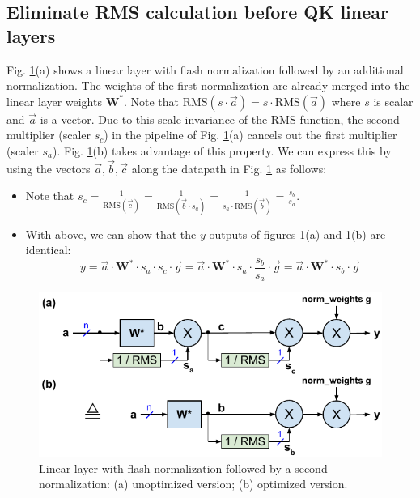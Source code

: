 \documentclass{article}
\newcommand{\mat}[1]{\mathbf{#1}}     %
\newcommand{\RMS}[1]{\text{RMS}(#1)}  %
\def\rms{\text{RMS}(\vec{a})}         %
\def\W*{\mat{W}^\ast}                 %
\def\a{\vec{a}}                       %
\def\b{\vec{b}}                       %
\def\c{\vec{c}}                       %
\def\vg{\vec{g}}                      %
\begin{document}
\subsection{Eliminate RMS calculation before QK linear layers}
Fig. \ref{fig6}(a) shows a linear layer with flash normalization followed by an additional normalization. The weights of the first normalization are already merged into the linear layer weights $\W*$. Note that $\RMS{s \cdot \a} = s \cdot \rms$ where $s$ is scalar and $\a$ is a vector. Due to this scale-invariance of the RMS function, the second multiplier (scaler $s_c$) in the pipeline of Fig. \ref{fig6}(a) cancels out the first multiplier (scaler $s_a$). Fig. \ref{fig6}(b) takes advantage of this property. We can express this by using the vectors $\a, \b, \c$ along the datapath in Fig. \ref{fig6} as follows:
\begin{itemize}[topsep=-1pt, itemsep=-1pt]
  \item Note that $s_c = \frac{1}{\RMS{\c}} = \frac{1}{\RMS{\b \cdot s_a}} = \frac{1}{s_a \cdot \RMS{\b}} = \frac{s_b}{s_a}$.
  \item With above, we can show that the $y$ outputs of figures \ref{fig6}(a) and \ref{fig6}(b) are identical:
    \begin{equation*}
      y = \a \cdot \W* \cdot s_a \cdot s_c \cdot \vg = \a \cdot \W* \cdot s_a \cdot \frac{s_b}{s_a} \cdot \vg
      = \a \cdot \W* \cdot s_b \cdot \vg
    \end{equation*}
\end{itemize}

\begin{figure}[h!] \centering
  \includegraphics[scale=0.9]{../doc/fig/flashNorm_fig6.pdf}
  \caption{Linear layer with flash normalization followed by a second normalization: (a) unoptimized version; (b) optimized version.}
\label{fig6} \end{figure}
\end{document}
